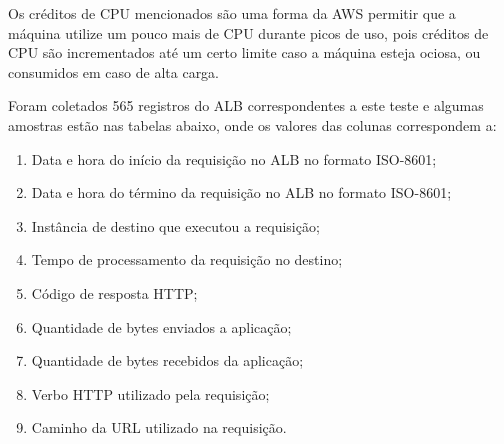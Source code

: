 Os créditos de CPU mencionados são uma forma da AWS permitir que a máquina
utilize um pouco mais de CPU durante picos de uso, pois créditos de CPU são
incrementados até um certo limite caso a máquina esteja ociosa, ou
consumidos em caso de alta carga.

Foram coletados 565 registros do ALB correspondentes a este teste e algumas
amostras estão nas tabelas abaixo, onde os valores das colunas correspondem a:

\begin{enumerate}
  \item Data e hora do início da requisição no ALB no formato ISO-8601;
  \item Data e hora do término da requisição no ALB no formato ISO-8601;
  \item Instância de destino que executou a requisição;
  \item Tempo de processamento da requisição no destino;
  \item Código de resposta HTTP;
  \item Quantidade de bytes enviados a aplicação;
  \item Quantidade de bytes recebidos da aplicação;
  \item Verbo HTTP utilizado pela requisição;
  \item Caminho da URL utilizado na requisição.
\end{enumerate}

